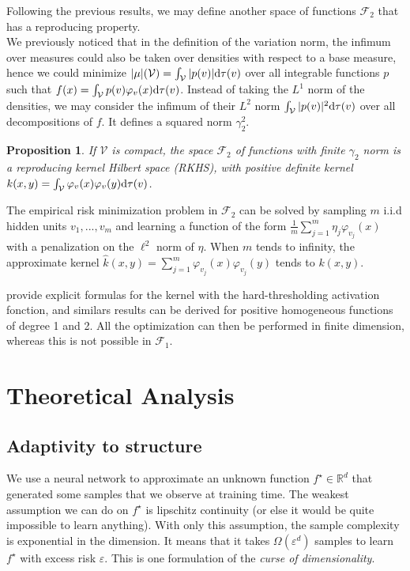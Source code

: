 \documentclass[a4paper, 11pt]{scrartcl}
\newtheorem{proposition}{Proposition}[section]
\begin{document}
Following the previous results, we may define another space of functions $\mathcal{F}_2$ that has a reproducing property. \\

We previously noticed that in the definition of the variation norm, the infimum over measures could also be taken over densities with respect to a base measure, hence we could minimize $|\mu|(\mathcal{V}) = \int_\mathcal{V} |p(v)| \textnormal{d}\tau(v)$ over all integrable functions $p$ such that $f(x) = \int_\mathcal{V} p(v) \varphi_v(x)\textnormal{d}\tau(v)$. Instead of taking the $L^1$ norm of the densities, we may consider the infimum of their $L^2$ norm $\int_\mathcal{V} |p(v)|^2 \textnormal{d}\tau(v)$ over all decompositions of $f$. It defines a squared norm $\gamma_2^2$.


\begin{proposition}
If $\mathcal{V}$ is compact, the space $\mathcal{F}_2$ of functions with finite $\gamma_2$ norm is a reproducing kernel Hilbert space (RKHS), with positive definite kernel $k(x,y)=\int_\mathcal{V} \varphi_v(x) \varphi_v(y) \textnormal{d}\tau(v)$.
\end{proposition}

The empirical risk minimization problem in $\mathcal{F}_2$ can be solved by sampling $m$ i.i.d hidden units $v_1,...,v_m$ and learning a function of the form $\frac{1}{m} \sum_{j=1}^m \eta_j \varphi_{v_j}(x)$ with a penalization on the $\ell^2$ norm of $\eta$. When $m$ tends to infinity, the approximate kernel $\hat k(x,y) = \sum_{j=1}^m \varphi_{v_j}(x) \varphi_{v_j}(y)$ tends to $k(x,y)$.

\cite{le2007continuous} provide explicit formulas for the kernel with the hard-thresholding activation fonction, and similars results can be derived for positive homogeneous functions of degree 1 and 2. All the optimization can then be performed in finite dimension, whereas this is not possible in $\mathcal{F}_1$. 

\section{Theoretical Analysis}

\subsection{Adaptivity to structure}

We use a neural network to approximate an unknown function $f^\star \in \mathbb{R}^d$ that generated some samples that we observe at training time. The weakest assumption we can do on $f^\star$ is lipschitz continuity (or else it would be quite impossible to learn anything). With only this assumption, the sample complexity is exponential in the dimension. It means that it takes $\Omega(\varepsilon^{d})$ samples to learn $f^\star$ with excess risk $\varepsilon$. This is one formulation of the \textit{curse of dimensionality}.
\end{document}
